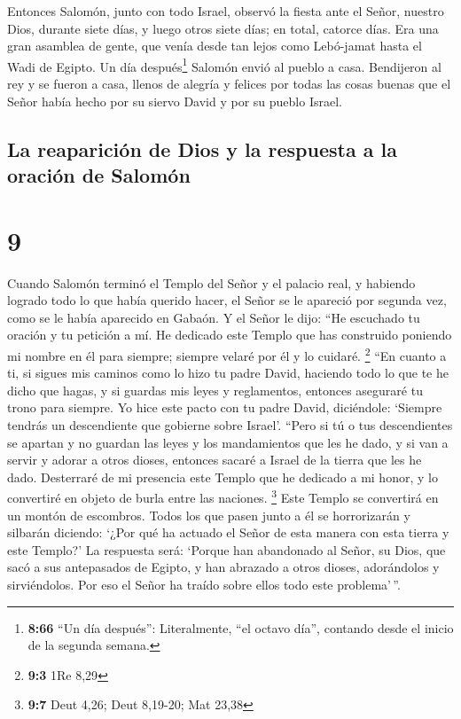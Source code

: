  Entonces Salomón, junto con todo Israel, observó la
fiesta ante el Señor, nuestro Dios, durante siete días, y luego otros
siete días; en total, catorce días. Era una gran asamblea de gente, que
venía desde tan lejos como Lebó-jamat hasta el Wadi de Egipto.
 Un día después\footnote{\textbf{8:66} ``Un día
  después'': Literalmente, ``el octavo día'', contando desde el inicio
  de la segunda semana.} Salomón envió al pueblo a casa. Bendijeron al
rey y se fueron a casa, llenos de alegría y felices por todas las cosas
buenas que el Señor había hecho por su siervo David y por su pueblo
Israel.

\hypertarget{la-reapariciuxf3n-de-dios-y-la-respuesta-a-la-oraciuxf3n-de-salomuxf3n}{%
\subsection{La reaparición de Dios y la respuesta a la oración de
Salomón}\label{la-reapariciuxf3n-de-dios-y-la-respuesta-a-la-oraciuxf3n-de-salomuxf3n}}

\hypertarget{section-8}{%
\section{9}\label{section-8}}

 Cuando Salomón terminó el Templo del Señor y el palacio
real, y habiendo logrado todo lo que había querido hacer, 
el Señor se le apareció por segunda vez, como se le había aparecido en
Gabaón.  Y el Señor le dijo: ``He escuchado tu oración y
tu petición a mí. He dedicado este Templo que has construido poniendo mi
nombre en él para siempre; siempre velaré por él y lo cuidaré.
\footnote{\textbf{9:3} 1Re 8,29}  ``En cuanto a ti, si
sigues mis caminos como lo hizo tu padre David, haciendo todo lo que te
he dicho que hagas, y si guardas mis leyes y reglamentos, 
entonces aseguraré tu trono para siempre. Yo hice este pacto con tu
padre David, diciéndole: `Siempre tendrás un descendiente que gobierne
sobre Israel'.  ``Pero si tú o tus descendientes se
apartan y no guardan las leyes y los mandamientos que les he dado, y si
van a servir y adorar a otros dioses,  entonces sacaré a
Israel de la tierra que les he dado. Desterraré de mi presencia este
Templo que he dedicado a mi honor, y lo convertiré en objeto de burla
entre las naciones. \footnote{\textbf{9:7} Deut 4,26; Deut 8,19-20; Mat
  23,38}  Este Templo se convertirá en un montón de
escombros. Todos los que pasen junto a él se horrorizarán y silbarán
diciendo: `¿Por qué ha actuado el Señor de esta manera con esta tierra y
este Templo?'  La respuesta será: `Porque han abandonado
al Señor, su Dios, que sacó a sus antepasados de Egipto, y han abrazado
a otros dioses, adorándolos y sirviéndolos. Por eso el Señor ha traído
sobre ellos todo este problema'\,''.

